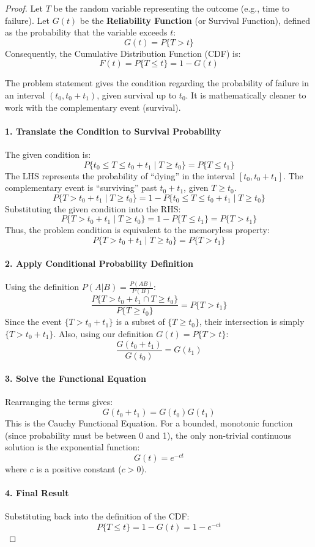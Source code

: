 \documentclass{article}
\begin{document}
\begin{proof}
	Let $T$ be the random variable representing the outcome (e.g., time to failure).
	Let $G(t)$ be the \textbf{Reliability Function} (or Survival Function), defined as the probability that the variable exceeds $t$:
	\[ G(t) = P\{T > t\} \]
	Consequently, the Cumulative Distribution Function (CDF) is:
	\[ F(t) = P\{T \le t\} = 1 - G(t) \]

	The problem statement gives the condition regarding the probability of failure in an interval $(t_0, t_0 + t_1)$, given
	survival up to $t_0$. It is mathematically cleaner to work with the complementary event (survival).

	\paragraph{1. Translate the Condition to Survival Probability}
	The given condition is:
	\[ P\{t_0 \le T \le t_0 + t_1 \mid T \ge t_0\} = P\{T \le t_1\} \]
	The LHS represents the probability of ``dying'' in the interval $[t_0, t_0+t_1]$. The complementary event is
	``surviving'' past $t_0+t_1$, given $T \ge t_0$.
	\[ P\{T > t_0 + t_1 \mid T \ge t_0\} = 1 - P\{t_0 \le T \le t_0 + t_1 \mid T \ge t_0\} \]
	Substituting the given condition into the RHS:
	\[ P\{T > t_0 + t_1 \mid T \ge t_0\} = 1 - P\{T \le t_1\} = P\{T > t_1\} \]
	Thus, the problem condition is equivalent to the memoryless property:
	\begin{equation}
		P\{T > t_0 + t_1 \mid T \ge t_0\} = P\{T > t_1\}
	\end{equation}

	\paragraph{2. Apply Conditional Probability Definition}
	Using the definition $P(A|B) = \frac{P(AB)}{P(B)}$:
	\[ \frac{P\{T > t_0 + t_1 \cap T \ge t_0\}}{P\{T \ge t_0\}} = P\{T > t_1\} \]
	Since the event $\{T > t_0 + t_1\}$ is a subset of $\{T \ge t_0\}$, their intersection is simply $\{T > t_0 + t_1\}$.
	Also, using our definition $G(t) = P\{T > t\}$:
	\[ \frac{G(t_0 + t_1)}{G(t_0)} = G(t_1) \]

	\paragraph{3. Solve the Functional Equation}
	Rearranging the terms gives:
	\[ G(t_0 + t_1) = G(t_0)G(t_1) \]
	This is the Cauchy Functional Equation. For a bounded, monotonic function (since probability must be between 0 and 1),
	the only non-trivial continuous solution is the exponential function:
	\[ G(t) = e^{-ct} \]
	where $c$ is a positive constant ($c > 0$).

	\paragraph{4. Final Result}
	Substituting back into the definition of the CDF:
	\[ P\{T \le t\} = 1 - G(t) = 1 - e^{-ct} \]
\end{proof}
\end{document}
